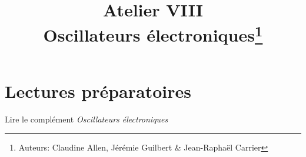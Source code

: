 \documentclass[canadien,12pt,oneside,letterpaper]{article}
\title{\textbf{Atelier VIII}\\Oscillateurs électroniques\thanks{Auteurs: Claudine Allen, Jérémie Guilbert \& Jean-Raphaël Carrier}}
\date{}
\begin{document}
\maketitle \vspace{-2cm}





\section{Lectures préparatoires}
Lire le complément \textit{Oscillateurs électroniques}
\end{document}
